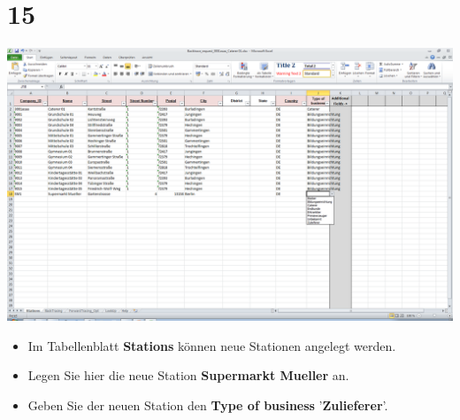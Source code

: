 \documentclass{beamer}
\begin{document}
\section{15}
\begin{frame}
	\begin{center}
  		\includegraphics[height=0.6\textheight]{15.png}
	\end{center}
	\begin{itemize}
		\item Im Tabellenblatt \textbf{Stations} können neue Stationen angelegt werden.
		\item Legen Sie hier die neue Station \textbf{Supermarkt Mueller} an.
		\item Geben Sie der neuen Station den \textbf{Type of business} '\textbf{Zulieferer}'.
	\end{itemize}
\end{frame}
\end{document}
